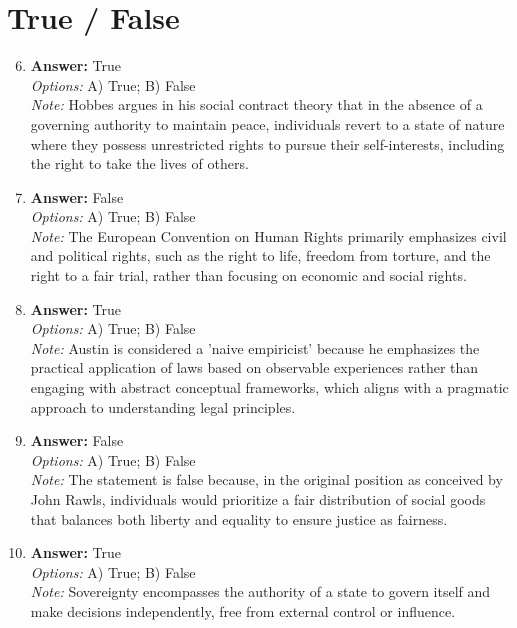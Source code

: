 \documentclass[12pt]{article}
\begin{document}
\section*{True / False}
\begin{enumerate}[label=\arabic*.]
\setcounter{enumi}{5}
\item \textbf{Answer:} True
\\ \textit{Options:} A) True; B) False
\\ \textit{Note:} Hobbes argues in his social contract theory that in the absence of a governing authority to maintain peace, individuals revert to a state of nature where they possess unrestricted rights to pursue their self-interests, including the right to take the lives of others.
\item \textbf{Answer:} False
\\ \textit{Options:} A) True; B) False
\\ \textit{Note:} The European Convention on Human Rights primarily emphasizes civil and political rights, such as the right to life, freedom from torture, and the right to a fair trial, rather than focusing on economic and social rights.
\item \textbf{Answer:} True
\\ \textit{Options:} A) True; B) False
\\ \textit{Note:} Austin is considered a 'naive empiricist' because he emphasizes the practical application of laws based on observable experiences rather than engaging with abstract conceptual frameworks, which aligns with a pragmatic approach to understanding legal principles.
\item \textbf{Answer:} False
\\ \textit{Options:} A) True; B) False
\\ \textit{Note:} The statement is false because, in the original position as conceived by John Rawls, individuals would prioritize a fair distribution of social goods that balances both liberty and equality to ensure justice as fairness.
\item \textbf{Answer:} True
\\ \textit{Options:} A) True; B) False
\\ \textit{Note:} Sovereignty encompasses the authority of a state to govern itself and make decisions independently, free from external control or influence.
\end{enumerate}
\end{document}
